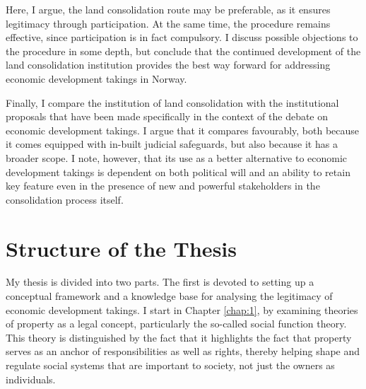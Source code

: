 Here, I argue, the land consolidation route may be preferable, as it ensures legitimacy through participation. At the same time, the procedure remains effective, since participation is in fact compulsory. I discuss possible objections to the procedure in some depth, but conclude that the continued development of the land consolidation institution provides the best way forward for addressing economic development takings in Norway.

Finally, I compare the institution of land consolidation with the institutional proposals that have been made specifically in the context of the debate on economic development takings. I argue that it compares favourably, both because it comes equipped with in-built judicial safeguards, but also because it has a broader scope. I note, however, that its use as a better alternative to economic development takings is dependent on both political will and an ability to retain key feature even in the presence of new and powerful stakeholders in the consolidation process itself.


\section{Structure of the Thesis}

My thesis is divided into two parts. The first is devoted to setting up a conceptual framework and a knowledge base for analysing the legitimacy of economic development takings. I start in Chapter \ref{chap:1}, by examining theories of property as a legal concept, particularly the so-called social function theory. This theory is distinguished by the fact that it highlights the fact that property serves as an anchor of responsibilities as well as rights, thereby helping shape and regulate social systems that are important to society, not just the owners as individuals.

